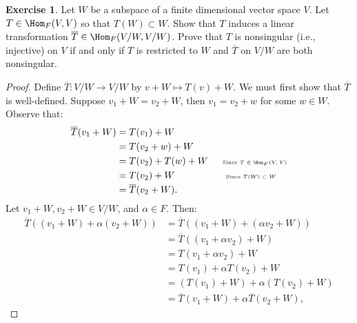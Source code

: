\documentclass[10pt,twoside,openany]{memoir}
\theoremstyle{plain}
\theoremstyle{definition}
\newtheorem{exercise}{Exercise}
\theoremstyle{remark}
\numberwithin{equation}{section}
\begin{document}
    \begin{exercise}
        Let $W$ be a subspace of a finite dimensional vector space $V$. Let $T \in \Hom_F{(V,V)}$ so that $T(W) \subset W$. Show that $T$ induces a linear transformation $\overline{T} \in \Hom_F{(V/W,V/W)}$. Prove that $T$ is nonsingular (i.e., injective) on $V$ if and only if $T$ is restricted to $W$ and $\overline{T}$ on $V/W$ are both nonsingular.
    \end{exercise}
        \begin{proof}
            Define $\overline{T}: V/W \rightarrow V/W$ by $v +W \mapsto T(v) + W$. We must first show that $\overline{T}$ is well-defined. Suppose $v_1 + W = v_2 + W$, then $v_1 = v_2 + w$ for some $w \in W$. Observe that:
                \begin{equation*}
                \begin{split}
                    \overline{T}(v_1 + W)
                    & = T(v_1) + W \\
                    & = T(v_2 + w) + W \\
                    & = T(v_2) + T(w) + W \hspace{15pt} \text{\tiny Since $T \in \Hom_F{(V,V)}$}\\
                    & = T(v_2) + W \hspace{53pt} \text{\tiny Since $T(W) \subset W$} \\
                    & = \overline{T}(v_2 + W).
                \end{split}
                \end{equation*}
            Let $v_1 + W , v_2 + W \in V/W$, and $\alpha \in F$. Then:
                \begin{equation*}
                \begin{split}
                    \overline{T}((v_1 + W) + \alpha(v_2 + W))
                    & = \overline{T}((v_1 + W) + (\alpha v_2 + W)) \\
                    & = \overline{T}((v_1 + \alpha v_2) + W) \\
                    & = T(v_1 + \alpha v_2) + W \\
                    & = T(v_1) + \alpha T(v_2) + W \\
                    & = (T(v_1) + W) + \alpha(T(v_2) + W) \\
                    & = \overline{T}(v_1 + W) + \alpha \overline{T}(v_2 + W),
                \end{split}

\end{equation*}
\end{proof}
\end{document}
